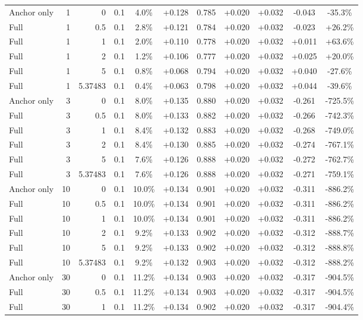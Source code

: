 \begin{table}[htbp]
\begin{tabular}{lrrrccccccc}
Anchor only & 1 & 0 & 0.1 & 4.0\% & +0.128 & 0.785 & +0.020 & +0.032 & -0.043 & -35.3\% \\
Full & 1 & 0.5 & 0.1 & 2.8\% & +0.121 & 0.784 & +0.020 & +0.032 & -0.023 & +26.2\% \\
Full & 1 & 1 & 0.1 & 2.0\% & +0.110 & 0.778 & +0.020 & +0.032 & +0.011 & +63.6\% \\
Full & 1 & 2 & 0.1 & 1.2\% & +0.106 & 0.777 & +0.020 & +0.032 & +0.025 & +20.0\% \\
Full & 1 & 5 & 0.1 & 0.8\% & +0.068 & 0.794 & +0.020 & +0.032 & +0.040 & -27.6\% \\
Full & 1 & 5.37483 & 0.1 & 0.4\% & +0.063 & 0.798 & +0.020 & +0.032 & +0.044 & -39.6\% \\
Anchor only & 3 & 0 & 0.1 & 8.0\% & +0.135 & 0.880 & +0.020 & +0.032 & -0.261 & -725.5\% \\
Full & 3 & 0.5 & 0.1 & 8.0\% & +0.133 & 0.882 & +0.020 & +0.032 & -0.266 & -742.3\% \\
Full & 3 & 1 & 0.1 & 8.4\% & +0.132 & 0.883 & +0.020 & +0.032 & -0.268 & -749.0\% \\
Full & 3 & 2 & 0.1 & 8.4\% & +0.130 & 0.885 & +0.020 & +0.032 & -0.274 & -767.1\% \\
Full & 3 & 5 & 0.1 & 7.6\% & +0.126 & 0.888 & +0.020 & +0.032 & -0.272 & -762.7\% \\
Full & 3 & 5.37483 & 0.1 & 7.6\% & +0.126 & 0.888 & +0.020 & +0.032 & -0.271 & -759.1\% \\
Anchor only & 10 & 0 & 0.1 & 10.0\% & +0.134 & 0.901 & +0.020 & +0.032 & -0.311 & -886.2\% \\
Full & 10 & 0.5 & 0.1 & 10.0\% & +0.134 & 0.901 & +0.020 & +0.032 & -0.311 & -886.2\% \\
Full & 10 & 1 & 0.1 & 10.0\% & +0.134 & 0.901 & +0.020 & +0.032 & -0.311 & -886.2\% \\
Full & 10 & 2 & 0.1 & 9.2\% & +0.133 & 0.902 & +0.020 & +0.032 & -0.312 & -888.7\% \\
Full & 10 & 5 & 0.1 & 9.2\% & +0.133 & 0.902 & +0.020 & +0.032 & -0.312 & -888.8\% \\
Full & 10 & 5.37483 & 0.1 & 9.2\% & +0.132 & 0.903 & +0.020 & +0.032 & -0.312 & -888.2\% \\
Anchor only & 30 & 0 & 0.1 & 11.2\% & +0.134 & 0.903 & +0.020 & +0.032 & -0.317 & -904.5\% \\
Full & 30 & 0.5 & 0.1 & 11.2\% & +0.134 & 0.903 & +0.020 & +0.032 & -0.317 & -904.5\% \\
Full & 30 & 1 & 0.1 & 11.2\% & +0.134 & 0.902 & +0.020 & +0.032 & -0.317 & -904.4\% \\

\end{tabular}
\end{table}
